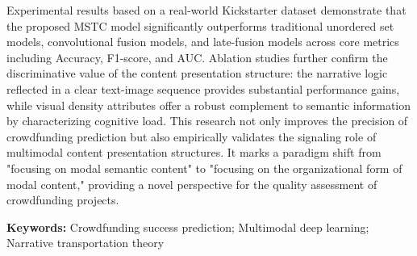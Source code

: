 \begin{enabstract}
Experimental results based on a real-world Kickstarter dataset demonstrate that the proposed MSTC model significantly outperforms traditional unordered set models, convolutional fusion models, and late-fusion models across core metrics including Accuracy, F1-score, and AUC. Ablation studies further confirm the discriminative value of the content presentation structure: the narrative logic reflected in a clear text-image sequence provides substantial performance gains, while visual density attributes offer a robust complement to semantic information by characterizing cognitive load. This research not only improves the precision of crowdfunding prediction but also empirically validates the signaling role of multimodal content presentation structures. It marks a paradigm shift from "focusing on modal semantic content" to "focusing on the organizational form of modal content," providing a novel perspective for the quality assessment of crowdfunding projects.

\textbf{Keywords: }Crowdfunding success prediction; Multimodal deep learning; Narrative transportation theory

\end{enabstract}

\newpage
\setcounter{table}{0}
\setcounter{figure}{0}
